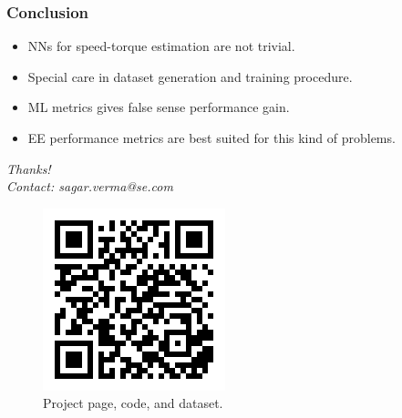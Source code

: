 \documentclass{beamer}
\begin{document}

\begin{frame}
\frametitle{Conclusion}
    \begin{itemize}
        \item NNs for speed-torque estimation are not trivial.
        \item Special care in dataset generation and training procedure.
        \item ML metrics gives false sense performance gain.
        \item EE performance metrics are best suited for this kind of problems.
    \end{itemize}
\end{frame}

\begin{frame}{}
  \centering \Large
  \emph{Thanks!} \\
  \emph{Contact: sagar.verma@se.com}

    \begin{figure}[ht!]
    \centering
    \includegraphics[scale=0.5]{images/qr.png}
    \vspace{-1em}
    \caption{Project page, code, and dataset.}
    \label{fig:static2}

\end{figure}

\end{frame}
\end{document}
